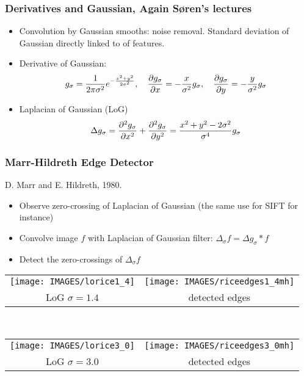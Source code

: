 \documentclass[9pt]{beamer}
\newcommand{\myemph}[1]{{\color{blue}{#1}}}
\begin{document}
\begin{frame}
  \frametitle{Derivatives and Gaussian, Again S{\o}ren's lectures}
  \begin{itemize} 
  \item Convolution by Gaussian smooths: noise removal. Standard
    deviation of Gaussian directly linked to \myemph{scale} of
    features.
  \item Derivative of Gaussian:
    $$
    g_\sigma = \frac{1}{2\pi\sigma^2}e^{-\frac{x^2 + y^2}{2\sigma^2}},\quad \frac{\partial{g_\sigma}}{\partial{x}} = -\frac{x}{\sigma^2}g_\sigma,\quad
    \frac{\partial{g_\sigma}}{\partial{y}} = -\frac{y}{\sigma^2}g_\sigma
    $$
  \item Laplacian of Gaussian (LoG)
    $$
    \Delta g_\sigma = \frac{\partial^{2}{g_\sigma}}{\partial{x^2}} +  \frac{\partial^{2}{g_\sigma}}{\partial{y^2}} = \frac{x^2 + y^2 - 2\sigma^2}{\sigma^4}g_\sigma
    $$
  \end{itemize}
\end{frame}




\begin{frame}
  \frametitle{Marr-Hildreth Edge Detector}
  D. Marr and E. Hildreth, 1980.
  \begin{itemize}
  \item Observe zero-crossing of Laplacian of Gaussian (the same use for SIFT for instance)
  \item Convolve image $f$ with Laplacian of Gaussian filter: $\Delta_\sigma f = \Delta g_\sigma \ast f$  
  \item Detect the zero-crossings of $\Delta_\sigma f$
  \end{itemize}
  \begin{center}
    \begin{tabular}[h]{cc}
      \texttt{[image: IMAGES/lorice1\_4]}& 
      \texttt{[image: IMAGES/riceedges1\_4mh]}\\
      LoG $\sigma = 1.4$ & detected edges
    \end{tabular}\\
    \begin{tabular}[h]{cc}
      \texttt{[image: IMAGES/lorice3\_0]}& 
      \texttt{[image: IMAGES/riceedges3\_0mh]}\\
      LoG $\sigma = 3.0$ & detected edges
    \end{tabular}\\
  \end{center}
\end{frame}
\end{document}
